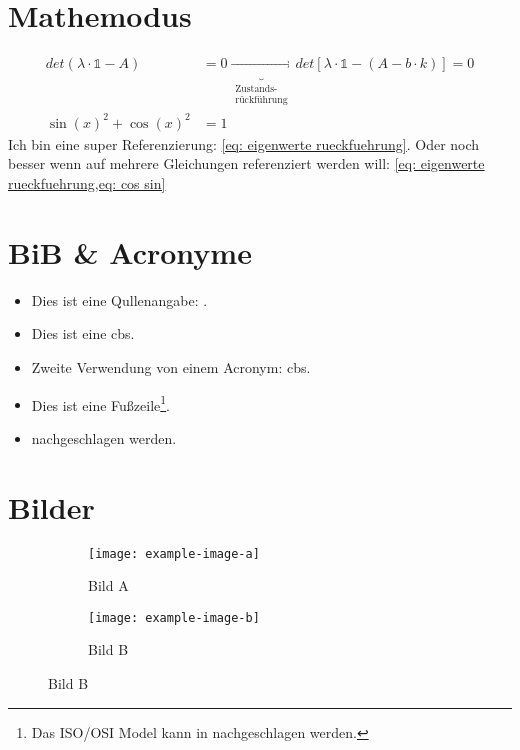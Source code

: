 \documentclass[./\jobname.tex]{subfiles}
\begin{document}
%
	\blindmathtrue
	\blinddocument
\chapter{Mathemodus}
%
\begin{align}
det(\lambda \cdot \mathds{1} -A) &= 0 \underbrace{\longrightarrow}_{\substack{\text{Zustands-} \\ \text{rückführung}}} det\left[\lambda\cdot \mathds{1} - \left(A-b\cdot k\right)\right]=0\label{eq: eigenwerte rueckfuehrung}\\
\sin(x)^{2} + \cos(x)^{2} &= 1\label{eq: cos sin}
\end{align}
%
Ich bin eine super Referenzierung: \cref{eq: eigenwerte rueckfuehrung}. Oder noch besser wenn auf mehrere Gleichungen referenziert werden will: \cref{eq: eigenwerte rueckfuehrung,eq: cos sin}
%
\chapter{BiB \& Acronyme}
%
\begin{itemize}
	\item Dies ist eine Qullenangabe: \parencite[Vgl.][S.220-224]{IEEE802.1Q2014}.
	\item Dies ist eine \gls{cbs}.
	\item Zweite Verwendung von einem Acronym: \gls{cbs}.
	\item Dies ist eine Fußzeile\footnote{Das ISO/OSI Model kann in \cite[][S.2-9]{Mandl2010} nachgeschlagen werden.}.
	\item \textcite[][S.2-9]{Mandl2010} nachgeschlagen werden.
\end{itemize}
%
\chapter{Bilder}
%
\begin{figure}[H]
\centering
\noindent{}
	\label{fig: example-image}
\end{figure}
%
\begin{figure}[H]
	\centering
	\begin{subfigure}[b]{0.5\textwidth}
		\centering
		\texttt{[image: example-image-a]}
		\caption{Bild A}
		\label{fig: Bild A}
	\end{subfigure}%
	\begin{subfigure}[b]{0.5\textwidth}
		\centering
		\texttt{[image: example-image-b]}
		\caption{Bild B}
		\label{fig: Bild B}
	\end{subfigure}%
	\label{fig: Bild A und B}
\end{figure}
%
\end{document}
